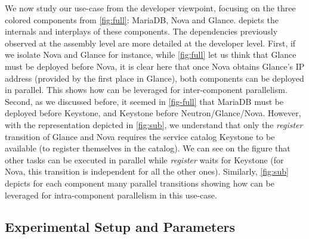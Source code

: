 We now study our use-case from the developer viewpoint, focusing on the three
colored components from \cref{fig:full}: MariaDB, Nova and Glance.
 depicts the internals and interplays of these components.
%
The dependencies previously observed at the assembly level are more
detailed at the developer level.
First, if we isolate Nova and Glance for instance, while \cref{fig:full} let us
think that Glance must be deployed before Nova, it is clear here that once Nova
obtains Glance's IP address (provided by the first place in Glance), both
components can be deployed in parallel. This shows how \mad can be leveraged for
inter-component parallelism.
Second, as we discussed before, it seemed in \cref{fig-full} that
MariaDB must be deployed before Keystone, and Keystone before
Neutron/Glance/Nova. However, with the \mad representation depicted in
\cref{fig:sub}, we understand that only the \emph{register} transition of Glance
and Nova requires the service catalog Keystone to be available (\ie to register
themselves in the catalog). We can see on the figure that other tasks can be
executed in parallel while \emph{register} waits for Keystone (\eg for Nova,
this transition is independent for all the other ones). Similarly,
\cref{fig:sub} depicts for each component many parallel transitions showing how
\mad can be leveraged for intra-component parallelism in this use-case.

\subsection{Experimental Setup and Parameters}

